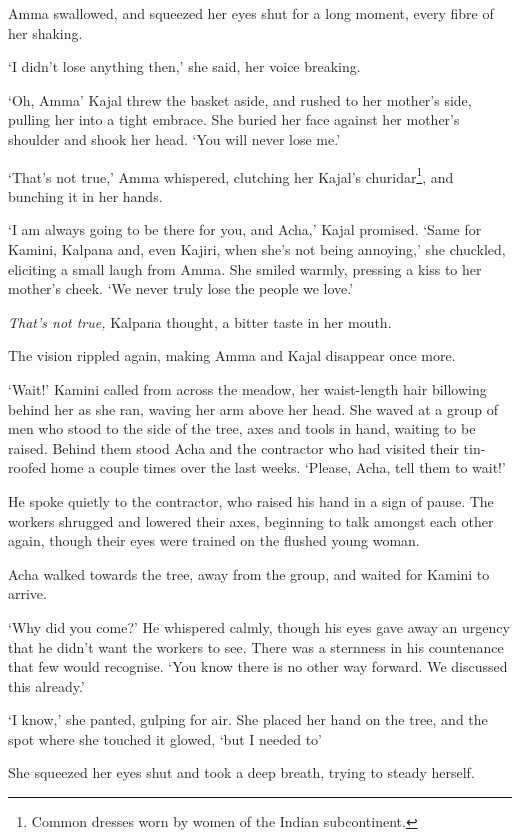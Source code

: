Amma swallowed, and squeezed her eyes shut for a long moment, every
fibre of her shaking.

`I didn't lose anything then,' she said, her voice breaking.

`Oh, Amma\textellipsis' Kajal threw the basket aside, and rushed to her mother's
side, pulling her into a tight embrace. She buried her face against
her mother's shoulder and shook her head. `You will never lose me.'

`That's not true,' Amma whispered, clutching her Kajal's
churidar\footnote{Common dresses worn by women of the Indian
  subcontinent.}, and bunching it in her hands.

`I am always going to be there for you, and Acha,' Kajal
promised. `Same for Kamini, Kalpana and, even Kajiri, when she's not
being annoying,' she chuckled, eliciting a small laugh from Amma. She
smiled warmly, pressing a kiss to her mother's cheek. `We never truly
lose the people we love.'

\emph{That's not true,} Kalpana thought, a bitter taste in her mouth.

The vision rippled again, making Amma and Kajal disappear once more.

`Wait!' Kamini called from across the meadow, her waist-length hair
billowing behind her as she ran, waving her arm above her head. She
waved at a group of men who stood to the side of the tree, axes and
tools in hand, waiting to be raised. Behind them stood Acha and the
contractor who had visited their tin-roofed home a couple times over
the last weeks. `Please, Acha, tell them to wait!'

He spoke quietly to the contractor, who raised his hand in a sign of
pause. The workers shrugged and lowered their axes, beginning to talk
amongst each other again, though their eyes were trained on the
flushed young woman.

Acha walked towards the tree, away from the group, and waited for
Kamini to arrive.

`Why did you come?' He whispered calmly, though his eyes gave away an
urgency that he didn't want the workers to see. There was a sternness
in his countenance that few would recognise. `You know there is no
other way forward. We discussed this already.'

`I know,' she panted, gulping for air. She placed her hand on the
tree, and the spot where she touched it glowed, `but I needed
to\textemdash'

She squeezed her eyes shut and took a deep breath, trying to steady herself.


